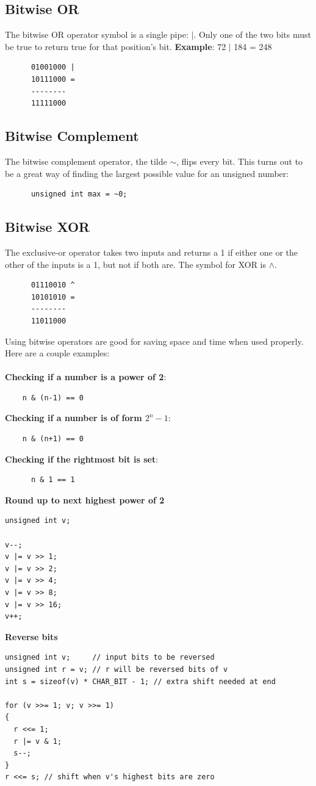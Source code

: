 \documentclass[]{book}
\begin{document}
    \subsection*{Bitwise OR}
    The bitwise OR operator symbol is a single pipe: $\vert$. Only one of the two bits must be true to return true
    for that position's bit. \textbf{Example}: 72 $\vert$ 184 = 248
    \begin{verbatim}
      01001000 |
      10111000 =
      --------
      11111000
    \end{verbatim}

    \subsection*{Bitwise Complement}
    The bitwise complement operator, the tilde $\sim$, flips every bit.
    This turns out to be a great way of finding the largest possible value for an unsigned number:
    \begin{verbatim}
      unsigned int max = ~0;
    \end{verbatim}

    \subsection*{Bitwise XOR}
    The exclusive-or operator takes two inputs and returns a 1 if either one or the other of the
    inputs is a 1, but not if both are. The symbol for XOR is $\wedge$.
    \begin{verbatim}
      01110010 ^
      10101010 =
      --------
      11011000
    \end{verbatim}
    \pagebreak

    Using bitwise operators are good for saving space and time when used properly. Here are a couple
    examples:\\\\
    \textbf{Checking if a number is a power of 2}:
    \begin{verbatim}
    n & (n-1) == 0
    \end{verbatim}
    \textbf{Checking if a number is of form $2^n-1$}:
    \begin{verbatim}
    n & (n+1) == 0
    \end{verbatim}
    \textbf{Checking if the rightmost bit is set}:
    \begin{verbatim}
      n & 1 == 1
    \end{verbatim}
    \textbf{Round up to next highest power of 2}
    \begin{Verbatim}
unsigned int v;

v--;
v |= v >> 1;
v |= v >> 2;
v |= v >> 4;
v |= v >> 8;
v |= v >> 16;
v++;
    \end{Verbatim}
    \textbf{Reverse bits}
    \begin{Verbatim}
unsigned int v;     // input bits to be reversed
unsigned int r = v; // r will be reversed bits of v
int s = sizeof(v) * CHAR_BIT - 1; // extra shift needed at end

for (v >>= 1; v; v >>= 1)
{
  r <<= 1;
  r |= v & 1;
  s--;
}
r <<= s; // shift when v's highest bits are zero
    \end{Verbatim}
\end{document}

